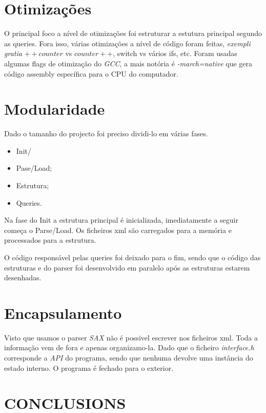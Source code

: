 \documentclass[letterpaper, 10 pt, conference]{IEEEtran}  %
\begin{document}
\section{Otimizações}

O principal foco a nível de otimizações foi estruturar a estutura principal segundo as queries. Fora isso, várias otimizações a nível de código foram feitas, \textit{exempli gratia} $++counter$ vs $counter++$, switch vs vários ifs, etc.
Foram usadas algumas flags de otimização do \textit{GCC}, a mais notória é \textit{-march=native} que gera código assembly específica para o CPU do computador.

\section{Modularidade}

Dado o tamanho do projecto foi preciso dividi-lo em várias fases.

\begin{itemize}
\item Init/
\item Pase/Load;
\item Estrutura;
\item Queries.
\end{itemize}

Na fase do Init a estrutura principal é inicializada, imediatamente a seguir começa o Parse/Load. Os ficheiros xml são carregados para a memória e processados para a estrutura.

O código responsável pelas queries foi deixado para o fim, sendo que o código das estruturas e do parser foi desenvolvido em paralelo após as estruturas estarem desenhadas.



\section{Encapsulamento}

Visto que usamos o parser \textit{SAX} não é possivel escrever nos ficheiros xml. Toda a informação vem de fora e apenas organizamo-la. Dado que o ficheiro \textit{interface.h} corresponde a \textit{API} do programa, sendo que nenhuma devolve uma instância do estado interno.
O programa é fechado para o exterior.

\section{CONCLUSIONS}
\end{document}
